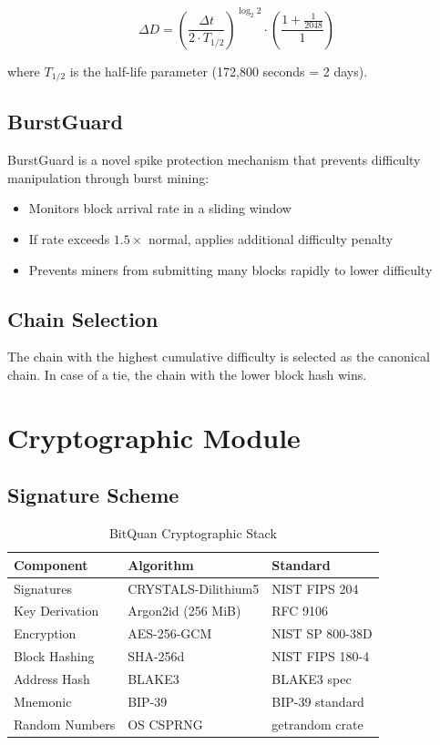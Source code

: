 \documentclass[11pt,a4paper]{article}
\begin{document}
\begin{equation}
    \Delta D = \left(\frac{\Delta t}{2 \cdot T_{1/2}}\right)^{\log_2{2}} \cdot \left(\frac{1 + \frac{1}{2048}}{1}\right)
\end{equation}

where $T_{1/2}$ is the half-life parameter (172,800 seconds = 2 days).

\subsection{BurstGuard}

BurstGuard is a novel spike protection mechanism that prevents difficulty manipulation through burst mining:

\begin{itemize}[leftmargin=*]
    \item Monitors block arrival rate in a sliding window
    \item If rate exceeds $1.5\times$ normal, applies additional difficulty penalty
    \item Prevents miners from submitting many blocks rapidly to lower difficulty
\end{itemize}

\subsection{Chain Selection}

The chain with the highest cumulative difficulty is selected as the canonical chain. In case of a tie, the chain with the lower block hash wins.

\section{Cryptographic Module}

\subsection{Signature Scheme}

\begin{table}[H]
\centering
\caption{BitQuan Cryptographic Stack}
\begin{tabular}{@{}llp{5cm}@{}}
\toprule
\textbf{Component} & \textbf{Algorithm} & \textbf{Standard} \\
\midrule
Signatures & CRYSTALS-Dilithium5 & NIST FIPS 204 \\
Key Derivation & Argon2id (256 MiB) & RFC 9106 \\
Encryption & AES-256-GCM & NIST SP 800-38D \\
Block Hashing & SHA-256d & NIST FIPS 180-4 \\
Address Hash & BLAKE3 & BLAKE3 spec \\
Mnemonic & BIP-39 & BIP-39 standard \\
Random Numbers & OS CSPRNG & getrandom crate \\
\bottomrule
\end{tabular}
\end{table}
\end{document}
